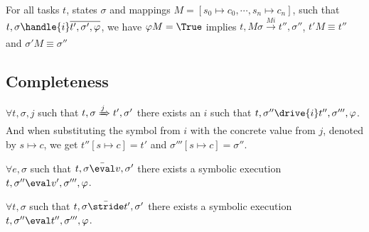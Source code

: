 \begin{lemma}
  \label{lem:soundhandle}

  For all tasks $t$, states $\sigma$ and mappings $M = [s_0\mapsto c_0,\cdots,s_n\mapsto c_n]$,
  such that $t,\sigma\handle{i} \overline{t',\sigma',\phi}$,
  we have $\phi M = \True$ implies
  $t,M \sigma \xrightarrow[]{M i} t'',\sigma''$, $t'M \equiv t'' $ and $\sigma' M \equiv \sigma''$
\end{lemma}

\subsection{Completeness}



%


\begin{theorem}
  \label{thm:completeDrive}
  $\forall t,\sigma,j$ such that $t,\sigma \xRightarrow[]{j} t',\sigma'$
  there exists an $i$ such that $t,\sigma''\drive{i} t'',\sigma''',\phi$.
  And when substituting the symbol from $i$ with the concrete value from $j$, denoted by $s\mapsto c$,
  we get $t''[s\mapsto c] = t'$ and $\sigma'''[s\mapsto c]=\sigma''$.
\end{theorem}

\begin{lemma}
  \label{lem:completeEval}
  $\forall e,\sigma$ such that $t,\sigma \bar{\eval}v,\sigma'$
  there exists a symbolic execution $t,\sigma''\eval v',\sigma''',\phi$.
\end{lemma}


\begin{lemma}
  \label{lem:completeStride}
  $\forall t,\sigma$ such that $t,\sigma \bar{\stride}t',\sigma'$
  there exists a symbolic execution $t,\sigma''\eval t'',\sigma''',\phi$.
\end{lemma}



